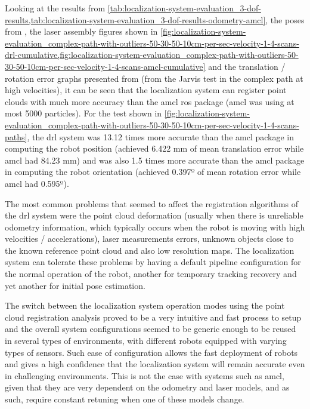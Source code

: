 Looking at the results from \cref{tab:localization-system-evaluation_3-dof-results,tab:localization-system-evaluation_3-dof-results-odometry-amcl}, the poses from , the laser assembly figures shown in \cref{fig:localization-system-evaluation_complex-path-with-outliers-50-30-50-10cm-per-sec-velocity-1-4-scans-drl-cumulative,fig:localization-system-evaluation_complex-path-with-outliers-50-30-50-10cm-per-sec-velocity-1-4-scans-amcl-cumulative} and the translation / rotation error graphs presented from  (from the Jarvis test in the complex path at high velocities), it can be seen that the localization system can register point clouds with much more accuracy than the \gls{amcl} \gls{ros} package (\gls{amcl} was using at most 5000 particles). For the test shown in \cref{fig:localization-system-evaluation_complex-path-with-outliers-50-30-50-10cm-per-sec-velocity-1-4-scans-paths}, the \gls{drl} system was 13.12 times more accurate than the \gls{amcl} package in computing the robot position (achieved 6.422 mm of mean translation error while \gls{amcl} had 84.23 mm) and was also 1.5 times more accurate than the \gls{amcl} package in computing the robot orientation (achieved 0.397º of mean rotation error while \gls{amcl} had 0.595º).

The most common problems that seemed to affect the registration algorithms of the \gls{drl} system were the point cloud deformation (usually when there is unreliable odometry information, which typically occurs when the robot is moving with high velocities / accelerations), laser measurements errors, unknown objects close to the known reference point cloud and also low resolution maps. The localization system can tolerate these problems by having a default pipeline configuration for the normal operation of the robot, another for temporary tracking recovery and yet another for initial pose estimation.

The switch between the localization system operation modes using the point cloud registration analysis proved to be a very intuitive and fast process to setup and the overall system configurations seemed to be generic enough to be reused in several types of environments, with different robots equipped with varying types of sensors. Such ease of configuration allows the fast deployment of robots and gives a high confidence that the localization system will remain accurate even in challenging environments. This is not the case with systems such as \gls{amcl}, given that they are very dependent on the odometry and laser models, and as such, require constant retuning when one of these models change.

